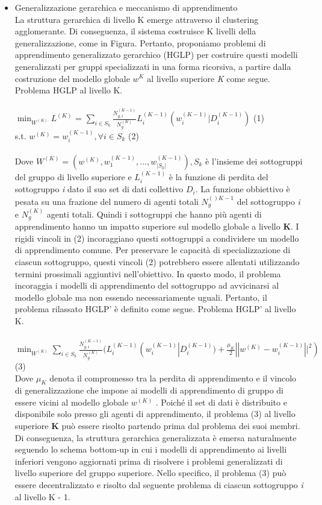 \begin{itemize}
\item Generalizzazione gerarchica e meccanismo di apprendimento\\

La struttura gerarchica di livello K emerge attraverso il clustering agglomerante. Di conseguenza, il sistema costruisce K livelli della generalizzazione, come in Figura. Pertanto, proponiamo problemi di apprendimento generalizzato gerarchico (HGLP) per costruire questi modelli generalizzati per gruppi specializzati in una forma ricorsiva, a partire dalla costruzione del modello globale $w^K$ al livello superiore \textsl{K} come segue. \\
Problema HGLP al livello K. \\\\
$\min_{W^{(K)}}L^{(K)}$ = $\sum_{i\in S_k} \frac{N_{g,i}^{(K-1)}}{N_g^{(K)}}L_i^{(K-1)}(w_i^{(K-1)}|D_i^{(K-1)})$ \hspace{2cm} (1)\\
s.t. $w^{(K)}=w_i^{(K-1)}, \forall i \in S_k$ \hspace{5cm} (2)\\
\\
Dove $W^{(K)}=(w^{(K)},w_1^{(K-1)},...,w_{|S_k|}^{(K-1)}), S_k$ è l'insieme dei sottogruppi del gruppo di livello superiore e $L_i^{(K-1)}$ è la funzione di perdita del sottogruppo \textsl{i} dato il suo set di dati collettivo $D_i$. La funzione obbiettivo è pesata su una frazione del numero di agenti totali $N_g^{()K-1}$ del sottogruppo \textsl{i} e $N_g^{(K)}$ agenti totali. Quindi i sottogruppi che hanno più agenti di apprendimento hanno un impatto superiore sul modello globale a livello \textbf{K}. I rigidi vincoli in (2) incoraggiano questi sottogruppi a condividere un modello di apprendimento comune. Per preservare le capacità di specializzazione di ciascun sottogruppo, questi vincoli (2) potrebbero essere allentati utilizzando termini prossimali aggiuntivi nell'obiettivo.
In questo modo, il problema incoraggia i modelli di apprendimento del sottogruppo ad avvicinarsi al modello globale ma non essendo necessariamente uguali. Pertanto, il problema rilassato HGLP' è definito come segue.
Problema HGLP' al livello K.\\\\
$\min_{W^{(K)}}\sum_{i\in S_k} \frac{N_{g,i}^{(K-1)}}{N_g^{(K)}}(L_i^{(K-1)}(w_i^{(K-1)}|D_i^{(K-1)}) +\frac{\mu_K}{2}||w^{(K)}-w_i^{(K-1)}||^2) $ \hspace{1cm} (3)\\
Dove $\mu_K$ denota il compromesso tra la perdita di apprendimento e il vincolo di generalizzazione che impone ai modelli di apprendimento di gruppo di essere vicini al modello globale $w^{(K)}$ . Poiché il set di dati è distribuito e disponibile solo presso gli agenti di apprendimento, il problema (3) al livello superiore \textbf{K} può essere risolto partendo prima dal problema dei suoi membri. Di conseguenza, la struttura gerarchica generalizzata è emersa naturalmente seguendo lo schema bottom-up in cui i modelli di apprendimento ai livelli inferiori vengono aggiornati prima di risolvere i problemi generalizzati di livello superiore del gruppo superiore. Nello specifico, il problema (3) può essere decentralizzato e risolto dal seguente problema di ciascun sottogruppo \textsl{i} al livello K - 1.

\end{itemize}
